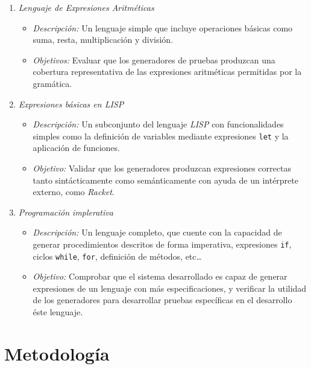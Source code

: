 \documentclass[11pt]{article}
\begin{document}
\begin{enumerate}
\item \textit{Lenguaje de Expresiones Aritméticas}

  \begin{itemize}
  \item \textit{Descripción:} Un lenguaje simple que incluye operaciones básicas como suma, resta, multiplicación y división.
  \item \textit{Objetivos:} Evaluar que los generadores de pruebas produzcan una cobertura representativa de las expresiones aritméticas permitidas por la gramática.
  \end{itemize}
  
\item \textit{Expresiones básicas en LISP}

  \begin{itemize}
  \item \textit{Descripción:} Un subconjunto del lenguaje \textit{LISP} con funcionalidades simples como la definición de variables mediante expresiones \texttt{let} y la aplicación de funciones.
  \item \textit{Objetivo:} Validar que los generadores produzcan expresiones correctas tanto sintácticamente como semánticamente con ayuda de un intérprete externo, como \textit{Racket}.
  \end{itemize}

\item \textit{Programación implerativa}

  \begin{itemize}
  \item \textit{Descripción:} Un lenguaje completo, que cuente con la capacidad de generar procedimientos descritos de forma imperativa, expresiones \texttt{if}, ciclos \texttt{while}, \texttt{for}, definición de métodos, etc\ldots
  \item \textit{Objetivo:} Comprobar que el sistema desarrollado es capaz de generar expresiones de un lenguaje con más especificaciones, y verificar la utilidad de los generadores para desarrollar pruebas específicas en el desarrollo éste lenguaje.
  \end{itemize}
  
\end{enumerate}

\section*{Metodología}
\end{document}
